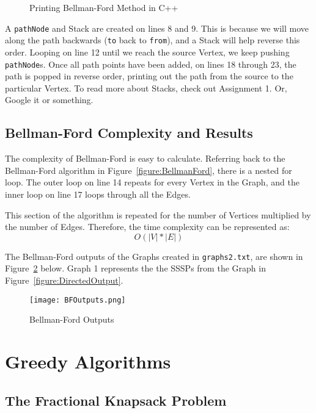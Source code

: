 \documentclass[letterpaper, 10pt,DIV=13]{scrartcl}
\numberwithin{equation}{section} %
\numberwithin{figure}{section} %
\numberwithin{table}{section} %
\begin{document}
\begin{figure}[ht] 
    \centering 
    
    \caption{Printing Bellman-Ford Method in C++}
    \label{figure:PrintBellmanFord}
\end{figure}

A \texttt{pathNode} and Stack are created on lines 8 and 9. This is because we will move along the path backwards (\texttt{to} back to \texttt{from}), and a Stack will help reverse this order. Looping on line 12 until we reach the source Vertex, we keep pushing \texttt{pathNode}s. Once all path points have been added, on lines 18 through 23, the path is popped in reverse order, printing out the path from the source to the particular Vertex. To read more about Stacks, check out Assignment 1. Or, Google it or something.


\pagebreak

\subsection{Bellman-Ford Complexity and Results}
The complexity of Bellman-Ford is easy to calculate. Referring back to the Bellman-Ford algorithm in Figure~\ref{figure:BellmanFord}, there is a nested for loop. The outer loop on line 14 repeats for every Vertex in the Graph, and the inner loop on line 17 loops through all the Edges. 

This section of the algorithm is repeated for the number of Vertices multiplied by the number of Edges. Therefore, the time complexity can be represented as:
\[O(|V|*|E|)\]

The Bellman-Ford outputs of the Graphs created in \texttt{graphs2.txt}, are shown in Figure~\ref{figure:BFOutupt} below. Graph 1 represents the the SSSPs from the Graph in Figure~\ref{figure:DirectedOutput}.


\begin{figure}[h] 
    \centering 
    \texttt{[image: BFOutputs.png]}
    \caption{Bellman-Ford Outputs\footnotemark}
    \label{figure:BFOutupt}
    
\end{figure}



\section{Greedy Algorithms}

\subsection{The Fractional Knapsack Problem}
\end{document}
